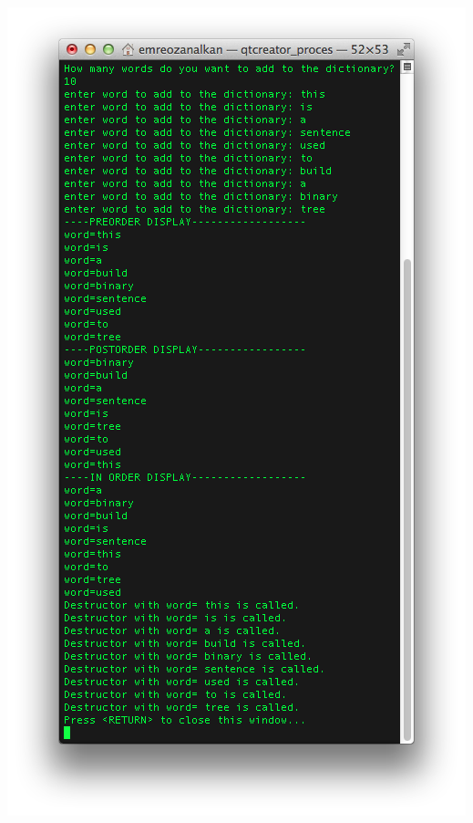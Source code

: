 \documentclass{article}
\begin{document}
\includegraphics[scale=0.8]{lab7Result.png}
\end{document}
